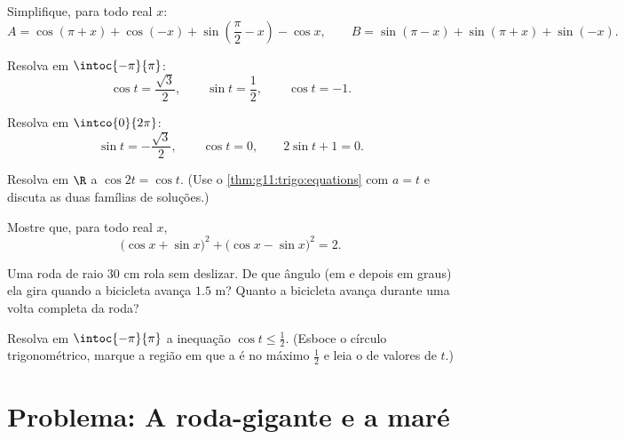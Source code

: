 \begin{exercise}[$\star\star$]\label{exo:g11:trigo:5}
Simplifique, para todo real $x$:
\[
A = \cos(\pi + x) + \cos(-x) + \sin\left(\frac\pi2 - x\right) - \cos x,
\qquad
B = \sin(\pi - x) + \sin(\pi + x) + \sin(-x) .
\]
\end{exercise}

\begin{exercise}[$\star\star$]\label{exo:g11:trigo:6}
Resolva em $\intoc{-\pi}{\pi}$:
\[
\cos t = \frac{\sqrt3}{2}, \qquad
\sin t = \frac12, \qquad
\cos t = -1 .
\]
\end{exercise}

\begin{exercise}[$\star\star$]\label{exo:g11:trigo:7}
Resolva em $\intco{0}{2\pi}$:
\[
\sin t = -\frac{\sqrt3}{2}, \qquad
\cos t = 0, \qquad
2\sin t + 1 = 0 .
\]
\end{exercise}

\begin{exercise}[$\star\star$]\label{exo:g11:trigo:8}
Resolva em $\R$ a  $\cos 2t = \cos t$. (Use o
\cref{thm:g11:trigo:equations} com $a = t$ e discuta as duas famílias de
soluções.)
\end{exercise}

\begin{exercise}[$\star\star$]\label{exo:g11:trigo:9}
Mostre que, para todo real $x$,
\[
\bigl(\cos x + \sin x\bigr)^2 + \bigl(\cos x - \sin x\bigr)^2 = 2 .
\]
\end{exercise}

\begin{exercise}[$\star\star$]\label{exo:g11:trigo:10}
Uma roda de raio $30$ cm rola sem deslizar. De que ângulo (em  e
depois em graus) ela gira quando a bicicleta avança $1.5$ m? Quanto a
bicicleta avança durante uma volta completa da roda?
\end{exercise}

\begin{exercise}[$\star\star\star$]\label{exo:g11:trigo:11}
Resolva em $\intoc{-\pi}{\pi}$ a inequação $\cos t \leq \frac12$.
(Esboce o círculo trigonométrico, marque a região em que a  é no
máximo $\frac12$ e leia o  de valores de $t$.)
\end{exercise}

\section{Problema: A roda-gigante e a maré}

